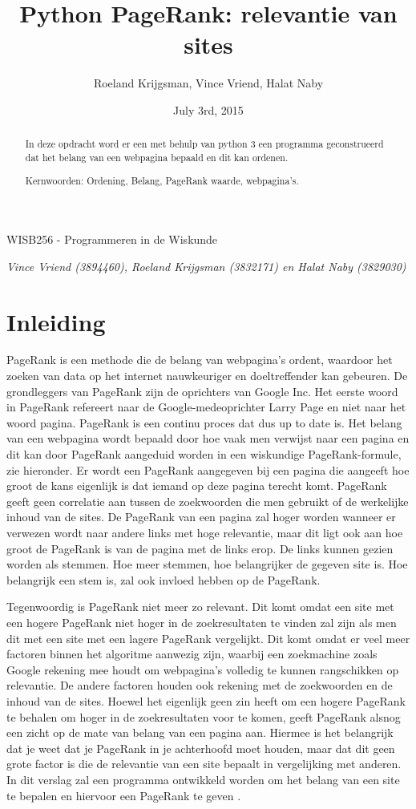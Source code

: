 \documentclass[12pt,a4paper]{article}
\author{Roeland Krijgsman, Vince Vriend, Halat Naby}
\date{July 3rd, 2015}
\title{Python PageRank: relevantie van sites}
\begin{document}
\maketitle
\vspace{.5pc}
\centerline{\sc WISB256 - Programmeren in de Wiskunde}
\centerline{\it Vince Vriend (3894460), Roeland Krijgsman (3832171) en Halat Naby (3829030)}
\vspace{2pc}

\begin{abstract}
In deze opdracht word er een met behulp van python 3 een programma geconstrueerd dat het belang van een webpagina bepaald en dit kan ordenen.

Kernwoorden: Ordening, Belang, PageRank waarde, webpagina's.
\end{abstract}

\section{Inleiding}
PageRank is een methode die de belang van webpagina's ordent, waardoor het zoeken van data op het internet nauwkeuriger en doeltreffender kan gebeuren. De grondleggers van PageRank zijn de oprichters van Google Inc. Het eerste woord in PageRank refereert naar de Google-medeoprichter Larry Page en niet naar het woord pagina. PageRank is een continu proces dat dus up to date is. Het belang van een webpagina wordt bepaald door hoe vaak men verwijst naar een pagina en dit kan door PageRank aangeduid worden in een wiskundige PageRank-formule, zie hieronder. Er wordt een PageRank aangegeven bij een pagina die aangeeft hoe groot de kans eigenlijk is dat iemand op deze pagina terecht komt. PageRank geeft geen correlatie aan tussen de zoekwoorden die men gebruikt of de werkelijke inhoud van de sites. De PageRank van een pagina zal hoger worden wanneer er verwezen wordt naar andere links met hoge relevantie, maar dit ligt ook aan hoe groot de PageRank is van de pagina met de links erop. De links kunnen gezien worden als stemmen. Hoe meer stemmen, hoe belangrijker de gegeven site is. Hoe belangrijk een stem is, zal ook invloed hebben op de PageRank. 
\vspace{1pc}

Tegenwoordig is PageRank niet meer zo relevant. Dit komt omdat een site met een hogere PageRank niet hoger in de zoekresultaten te vinden zal zijn als men dit met een site met een lagere PageRank vergelijkt. Dit komt omdat er veel meer factoren binnen het algoritme aanwezig zijn, waarbij een zoekmachine zoals Google rekening mee houdt om webpagina's volledig te kunnen rangschikken op relevantie. De andere factoren houden ook rekening met de zoekwoorden en de inhoud van de sites. Hoewel het eigenlijk geen zin heeft om een hogere PageRank te behalen om hoger in de zoekresultaten voor te komen, geeft PageRank alsnog een zicht op de mate van belang van een pagina aan. Hiermee is het belangrijk dat je weet dat je PageRank in je achterhoofd moet houden, maar dat dit geen grote factor is die de relevantie van een site bepaalt in vergelijking met anderen. In dit verslag zal een programma ontwikkeld worden om het belang van een site te bepalen en hiervoor een PageRank te geven \cite{1} \cite{3}.
\end{document}
